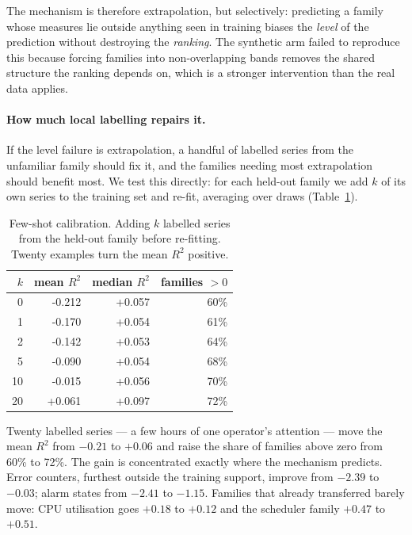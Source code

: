\documentclass[11pt,a4paper]{article}
\newcommand{\num}[1]{#1}
\begin{document}
The mechanism is therefore extrapolation, but selectively: predicting a family
whose measures lie outside anything seen in training biases the \emph{level} of
the prediction without destroying the \emph{ranking}. The synthetic arm failed
to reproduce this because forcing families into non-overlapping bands removes
the shared structure the ranking depends on, which is a stronger intervention
than the real data applies.

\paragraph{How much local labelling repairs it.} If the level failure is
extrapolation, a handful of labelled series from the unfamiliar family should
fix it, and the families needing most extrapolation should benefit most. We test
this directly: for each held-out family we add \(k\) of its own series to the
training set and re-fit, averaging over draws
(Table~\ref{tab:fewshot}).

\begin{table}[t]
\centering
\caption{Few-shot calibration. Adding \(k\) labelled series from the held-out
family before re-fitting. Twenty examples turn the mean \(R^2\) positive.}
\label{tab:fewshot}
\small
\begin{tabular}{rrrr}
\toprule
\(k\) & mean \(R^2\) & median \(R^2\) & families \(>0\) \\
\midrule
0  & \num{-0.212} & \num{+0.057} & 60\% \\
1  & \num{-0.170} & \num{+0.054} & 61\% \\
2  & \num{-0.142} & \num{+0.053} & 64\% \\
5  & \num{-0.090} & \num{+0.054} & 68\% \\
10 & \num{-0.015} & \num{+0.056} & 70\% \\
20 & \num{+0.061} & \num{+0.097} & 72\% \\
\bottomrule
\end{tabular}
\end{table}

Twenty labelled series --- a few hours of one operator's attention --- move the
mean \(R^2\) from \(-0.21\) to \(+0.06\) and raise the share of families
above zero from \num{60}\% to \num{72}\%. The gain is concentrated exactly
where the mechanism predicts. Error counters, furthest outside the training
support, improve from \(-2.39\) to \(-0.03\); alarm states from \(-2.41\) to
\(-1.15\). Families that already transferred barely move: CPU utilisation goes
\(+0.18\) to \(+0.12\) and the scheduler family \(+0.47\) to \(+0.51\).
\end{document}
